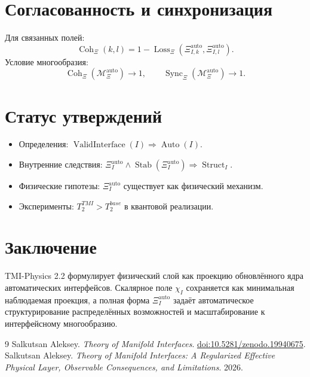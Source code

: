 \documentclass[12pt,a4paper]{article}
\DeclareMathOperator{\Valid}{ValidInterface}
\DeclareMathOperator{\Auto}{Auto}
\DeclareMathOperator{\Struct}{Struct}
\DeclareMathOperator{\Coh}{Coh}
\DeclareMathOperator{\Sync}{Sync}
\DeclareMathOperator{\Loss}{Loss}
\DeclareMathOperator{\Stab}{Stab}
\newcommand{\XiAuto}{\Xi_I^{\mathrm{auto}}}
\newcommand{\XiMan}{\mathcal M_{\Xi}^{\mathrm{auto}}}
\begin{document}
\section{Согласованность и синхронизация}
Для связанных полей:
\begin{equation}
\Coh_\Xi(k,l)=1-\Loss_\Xi(\Xi_{I,k}^{\mathrm{auto}},\Xi_{I,l}^{\mathrm{auto}}).
\end{equation}
Условие многообразия:
\begin{equation}
\Coh_\Xi(\XiMan)\to1,\qquad \Sync_\Xi(\XiMan)\to1.
\end{equation}

\section{Статус утверждений}
\begin{itemize}
\item Определения: \(\Valid(I)\Rightarrow\Auto(I)\).
\item Внутренние следствия: \(\XiAuto\land\Stab(\XiAuto)\Rightarrow\Struct_I\).
\item Физические гипотезы: \(\XiAuto\) существует как физический механизм.
\item Эксперименты: \(T_2^{TMI}>T_2^{base}\) в квантовой реализации.
\end{itemize}

\section{Заключение}
TMI-Physics 2.2 формулирует физический слой как проекцию обновлённого ядра автоматических интерфейсов. Скалярное поле \(\chi_I\) сохраняется как минимальная наблюдаемая проекция, а полная форма \(\XiAuto\) задаёт автоматическое структурирование распределённых возможностей и масштабирование к интерфейсному многообразию.

\begin{thebibliography}{9}
 Salkutsan Aleksey. \textit{Theory of Manifold Interfaces}. \href{https://doi.org/10.5281/zenodo.19940675}{doi:10.5281/zenodo.19940675}.
 Salkutsan Aleksey. \textit{Theory of Manifold Interfaces: A Regularized Effective Physical Layer, Observable Consequences, and Limitations}. 2026.
\end{thebibliography}
\end{document}
